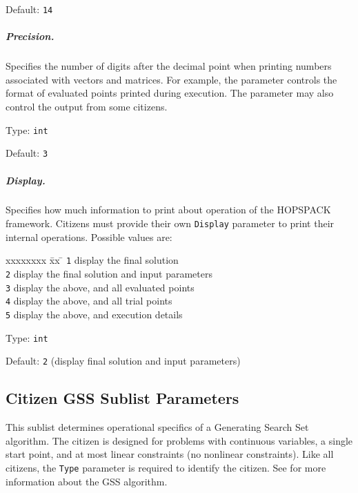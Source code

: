 \hspace{0.2in}
Default: {\tt 14}

\subparagraph{Precision.}  \label{param:MD-prec}
Specifies the number of digits after the decimal point when
printing numbers associated with vectors and matrices.  For example,
the parameter controls the format of evaluated points printed during
execution.  The parameter may also control the output from some citizens.

\hspace{0.2in}
Type: {\tt int}

\hspace{0.2in}
Default: {\tt 3}

\subparagraph{Display.}  \label{param:MD-display}
Specifies how much information to print about operation of
the HOPSPACK framework.  Citizens must provide their own {\tt Display} parameter
to print their internal operations.
Possible values are:
\begin{tabbing}
  xxxxxxxx \= xx \= \kill
     \> {\tt 1} \> display the final solution  \\
     \> {\tt 2} \> display the final solution and input parameters  \\
     \> {\tt 3} \> display the above, and all evaluated points  \\
     \> {\tt 4} \> display the above, and all trial points  \\
     \> {\tt 5} \> display the above, and execution details
\end{tabbing}

\hspace{0.2in}
Type: {\tt int}

\hspace{0.2in}
Default: {\tt 2} (display final solution and input parameters)


\subsection{Citizen GSS Sublist Parameters}
\label{subconfig:GS}

This sublist determines operational specifics of a Generating Search Set
algorithm.  The citizen is designed for problems with continuous variables,
a single start point, and at most linear constraints (no nonlinear constraints).
Like all citizens, the {\tt Type} parameter is required to identify the citizen.
See  for more information about the GSS algorithm.

